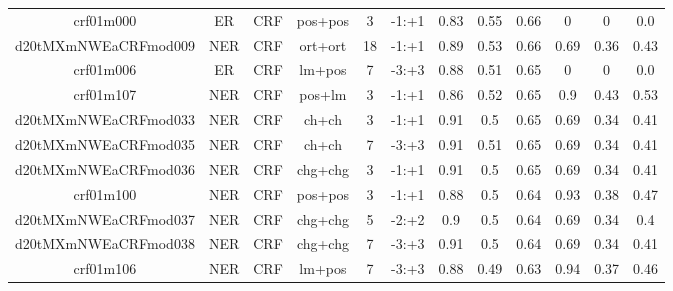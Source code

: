 \documentclass[a4paper]{article}
\begin{document}
\begin{landscape}
\begin{center}
\begin{tabular}{ |c|c|c|c|c|c|c|c|c|c|c|c|}
 
 	
 	\small{ crf01m000 } & ER & CRF & pos+pos  &  3 &  -1:+1  &  0.83 & 0.55 & 0.66  &  0 & 0 & 0.0 \\
 	

 
 	
 	\small{ d20tMXmNWEaCRFmod009 } & NER & CRF & ort+ort  &  18 &  -1:+1  &  0.89 & 0.53 & 0.66  &  0.69 & 0.36 & 0.43 \\
 	

 
 	
 	\small{ crf01m006 } & ER & CRF & lm+pos  &  7 &  -3:+3  &  0.88 & 0.51 & 0.65  &  0 & 0 & 0.0 \\
 	

 
 	
 	\small{ crf01m107 } & NER & CRF & pos+lm  &  3 &  -1:+1  &  0.86 & 0.52 & 0.65  &  0.9 & 0.43 & 0.53 \\
 	

 
 	
 	\small{ d20tMXmNWEaCRFmod033 } & NER & CRF & ch+ch  &  3 &  -1:+1  &  0.91 & 0.5 & 0.65  &  0.69 & 0.34 & 0.41 \\
 	

 
 	
 	\small{ d20tMXmNWEaCRFmod035 } & NER & CRF & ch+ch  &  7 &  -3:+3  &  0.91 & 0.51 & 0.65  &  0.69 & 0.34 & 0.41 \\
 	

 
 	
 	\small{ d20tMXmNWEaCRFmod036 } & NER & CRF & chg+chg  &  3 &  -1:+1  &  0.91 & 0.5 & 0.65  &  0.69 & 0.34 & 0.41 \\
 	

 
 	
 	\small{ crf01m100 } & NER & CRF & pos+pos  &  3 &  -1:+1  &  0.88 & 0.5 & 0.64  &  0.93 & 0.38 & 0.47 \\
 	

 
 	
 	\small{ d20tMXmNWEaCRFmod037 } & NER & CRF & chg+chg  &  5 &  -2:+2  &  0.9 & 0.5 & 0.64  &  0.69 & 0.34 & 0.4 \\
 	

 
 	
 	\small{ d20tMXmNWEaCRFmod038 } & NER & CRF & chg+chg  &  7 &  -3:+3  &  0.91 & 0.5 & 0.64  &  0.69 & 0.34 & 0.41 \\
 	

 
 	
 	\small{ crf01m106 } & NER & CRF & lm+pos  &  7 &  -3:+3  &  0.88 & 0.49 & 0.63  &  0.94 & 0.37 & 0.46 \\
 	


\end{tabular}
\end{center}
\end{landscape}
\end{document}
